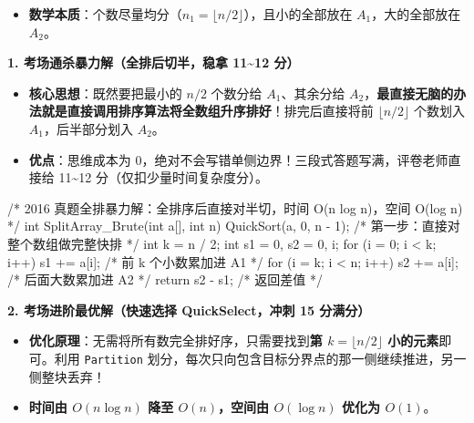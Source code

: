 \documentclass[10pt,a4paper]{ctexart}
\begin{document}
\begin{itemize}

\item \textbf{数学本质}：个数尽量均分（$n_1 = \lfloor n/2 \rfloor$），且小的全部放在 $A_1$，大的全部放在 $A_2$。

\end{itemize}

\par\addvspace{2pt}\noindent\textbf{1. 考场通杀暴力解（全排后切半，稳拿 11\textasciitilde{}12 分）}\par

\begin{itemize}

\item \textbf{核心思想}：既然要把最小的 $n/2$ 个数分给 $A_1$、其余分给 $A_2$，\textbf{最直接无脑的办法就是直接调用排序算法将全数组升序排好}！排完后直接将前 $\lfloor n/2 \rfloor$ 个数划入 $A_1$，后半部分划入 $A_2$。

\item \textbf{优点}：思维成本为 0，绝对不会写错单侧边界！三段式答题写满，评卷老师直接给 11\textasciitilde{}12 分（仅扣少量时间复杂度分）。

\end{itemize}

\begin{codebox}
/* 2016 真题全排暴力解：全排序后直接对半切，时间 O(n log n)，空间 O(log n) */
int SplitArray_Brute(int a[], int n) {
    QuickSort(a, 0, n - 1);             /* 第一步：直接对整个数组做完整快排 */
    int k = n / 2;
    int s1 = 0, s2 = 0, i;
    for (i = 0; i < k; i++) s1 += a[i]; /* 前 k 个小数累加进 A1 */
    for (i = k; i < n; i++) s2 += a[i]; /* 后面大数累加进 A2 */
    return s2 - s1;                     /* 返回差值 */
}
\end{codebox}

\par\addvspace{2pt}\noindent\textbf{2. 考场进阶最优解（快速选择 QuickSelect，冲刺 15 分满分）}\par

\begin{itemize}

\item \textbf{优化原理}：无需将所有数完全排好序，只需要找到\textbf{第 $k = \lfloor n/2 \rfloor$ 小的元素}即可。利用 \texttt{Partition} 划分，每次只向包含目标分界点的那一侧继续推进，另一侧整块丢弃！

\item \textbf{时间由 $O(n \log n)$ 降至 $O(n)$，空间由 $O(\log n)$ 优化为 $O(1)$}。

\end{itemize}
\end{document}
